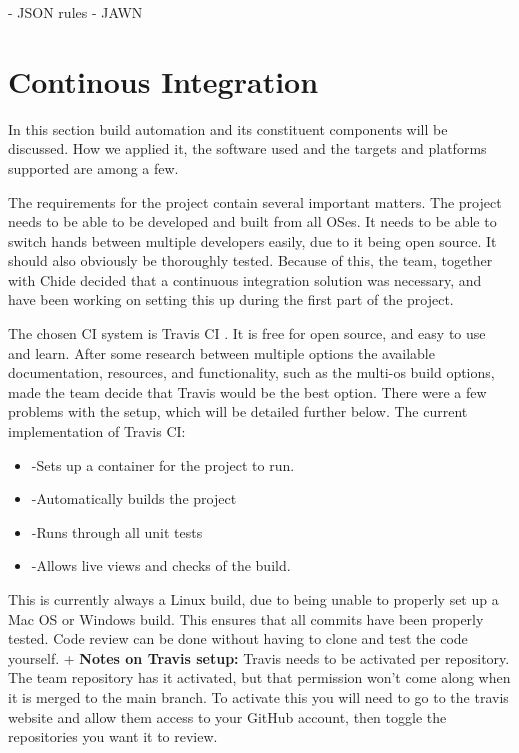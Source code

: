 \documentclass[10pt]{extarticle} %
\begin{document}
    - JSON rules
    - JAWN

    \newpage
    \section{Continous Integration}
    In this section build automation and its constituent components will be discussed.
    How we applied it, the software used and the targets and platforms supported are among a few.

    The requirements for the project contain several important matters.
    The project needs to be able to be developed and built from all OSes.
    It needs to be able to switch hands between multiple developers easily, due to it being open source.
    It should also obviously be thoroughly tested.
    Because of this, the team, together with Chide decided that a continuous integration solution was necessary, and have been working on setting this up during the first part of the project.

    The chosen CI system is Travis CI .
    It is free for open source, and easy to use and learn.
    After some research between multiple options the available documentation, resources, and functionality, such as the multi-os build options, made the team decide that Travis would be the best option.
    There were a few problems with the setup, which will be detailed further below.
    The current implementation of Travis CI:
    \begin{itemize}
                 \item-Sets up a container for the project to run.
                 \item-Automatically builds the project
                 \item-Runs through all unit tests
                 \item-Allows live views and checks of the build.
             \end{itemize}
    This is currently always a Linux build, due to being unable to properly set up a Mac OS or Windows build.
    This ensures that all commits have been properly tested.
    Code review can be done without having to clone and test the code yourself.
    +
    \textbf{Notes on Travis setup:}
    Travis needs to be activated per repository.
    The team repository has it activated, but that permission won't come along when it is merged to the main branch.
    To activate this you will need to go to the travis website and allow them access to your GitHub account, then toggle the repositories you want it to review.
\end{document}
